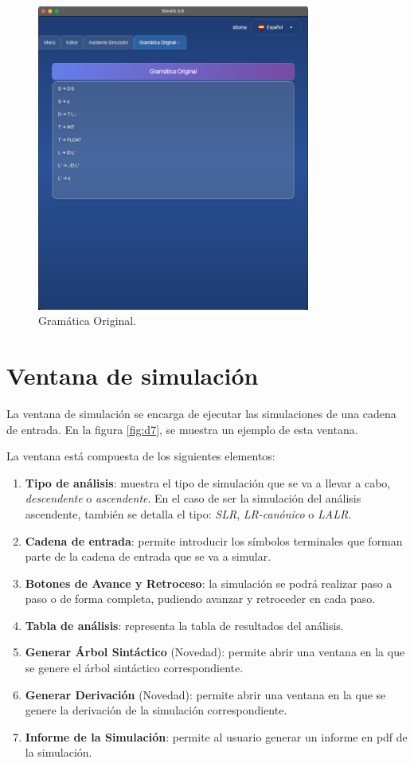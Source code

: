 \begin{figure}[htp]
\centering
\includegraphics[width=0.8\textwidth]{figuras2/simulador/gramatica_original.png}
\caption{Gramática Original.}
\label{fig:d10}
\end{figure}

 \section{Ventana de simulación}

La ventana de simulación se encarga de ejecutar las simulaciones de una cadena de entrada. En la figura \ref{fig:d7}, se muestra un ejemplo de esta ventana.

La ventana está compuesta de los siguientes elementos:
\begin{enumerate}
  \item \textbf{Tipo de análisis}: muestra el tipo de simulación que se va a llevar a cabo, \textit{descendente} o \textit{ascendente}. En el caso de ser la simulación del análisis ascendente, también se detalla el tipo: \textit{SLR}, \textit{LR-canónico} o \textit{LALR}.
 \item \textbf{Cadena de entrada}: permite introducir los símbolos terminales que forman parte de la cadena de entrada que se va a simular.
 \item \textbf{Botones de Avance y Retroceso}: la simulación se podrá realizar paso a paso o de forma completa, pudiendo avanzar y retroceder en cada paso.
 \item \textbf{Tabla de análisis}: representa la tabla de resultados del análisis.
 \item \textbf{Generar Árbol Sintáctico} (Novedad): permite abrir una ventana en la que se genere el árbol sintáctico correspondiente.
 \item \textbf{Generar Derivación} (Novedad): permite abrir una ventana en la que se genere la derivación de la simulación correspondiente.
 \item \textbf{Informe de la Simulación}: permite al usuario generar un informe en pdf de la simulación.
\end{enumerate}

